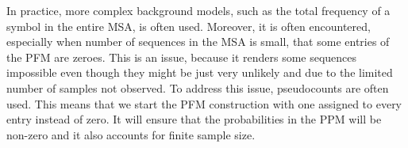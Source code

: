In practice, more complex background models, such as the total frequency of a symbol in the entire MSA, is often used.
Moreover, it is often encountered, especially when number of sequences in the MSA is small, that some entries of the PFM are zeroes.
This is an issue, because it renders some sequences impossible even though they might be just very unlikely and due to the limited number of samples not observed.
To address this issue, pseudocounts are often used.
This means that we start the PFM construction with one assigned to every entry instead of zero.
It will ensure that the probabilities in the PPM will be non-zero and it also accounts for finite sample size.


        

        
        
        
        
        
        
